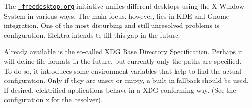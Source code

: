 The \href{https://freedesktop.org}{\texttt{ freedesktop.\+org}} initiative unifies different desktops using the X Window System in various ways. The main focus, however, lies in K\+DE and Gnome integration. One of the most disturbing and still unresolved problems is configuration. Elektra intends to fill this gap in the future.

Already available is the so-\/called X\+DG Base Directory Specification. Perhaps it will define file formats in the future, but currently only the paths are specified. To do so, it introduces some environment variables that help to find the actual configuration. Only if they are unset or empty, a built-\/in fallback should be used. If desired, elektrified applications behave in a X\+DG conforming way. (See the configuration x for \mbox{\hyperlink{autotoc_md618_src_plugins_resolver_README_md}{the resolver}}). 